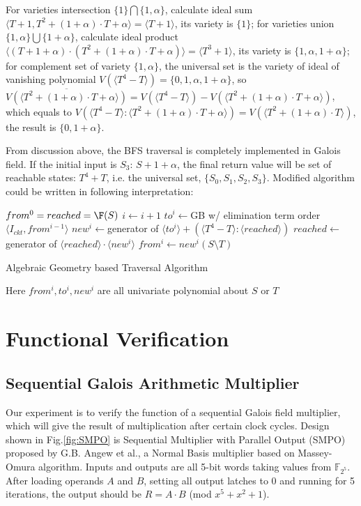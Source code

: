 For varieties intersection $\{1\}\bigcap\{1, \alpha\}$, calculate ideal sum $\langle T+1, T^2 + (1+\alpha)\cdot T+\alpha\rangle  = \langle T+1\rangle $,
its variety is $\{1\}$; for varieties union $\{1,\alpha\}\bigcup\{1+\alpha\}$, calculate
ideal product $\langle (T+1+\alpha)\cdot(T^2 + (1+\alpha)\cdot T+\alpha)\rangle  = \langle T^3 + 1\rangle $, its variety
is $\{1, \alpha, 1+\alpha\}$; for complement set of variety $\{1, \alpha\}$, the universal set is
the variety of ideal of vanishing polynomial $V(\langle T^4-T\rangle ) = \{0,1,\alpha,1+\alpha\}$,
so $\overline{V(\langle T^2 + (1+\alpha)\cdot T+\alpha\rangle )} = V(\langle T^4-T\rangle ) - V(\langle T^2 + (1+\alpha)\cdot T+\alpha\rangle )$,
which equals to $V(\langle T^4-T\rangle :\langle T^2 + (1+\alpha)\cdot T+\alpha\rangle ) = V(\langle T^2+(1+\alpha)\cdot T\rangle )$,
the result is $\{0,1+\alpha\}$.

From discussion above, the BFS traversal is completely implemented in Galois field.
If the initial input is $S_3$: $S + 1 + \alpha$, the final return value will be set of
reachable states: $T^4 + T$, i.e. the universal set, $\{S_0, S_1, S_2, S_3\}$. Modified algorithm could be
written in following interpretation:

\begin{algorithm}[hbt]
\SetAlgoNoLine

  $from^0 = reached = \F(S)$\;
  {
  	$i \gets i + 1$\;
	$to^i \gets$GB w/ elimination term order$\langle I_{ckt}, from^{i-1}\rangle$\;
	$new^i \gets $generator of $\langle to^i\rangle + (\langle T^4-T\rangle:\langle reached\rangle)$\;
  	$reached \gets $generator of $\langle reached\rangle \cdot \langle new^i\rangle$\;
	$from^i \gets new^i(S\setminus T)$\;
  }
\caption {Algebraic Geometry based Traversal Algorithm}\label{alg:modified}
\end{algorithm}

Here $from^i, to^i, new^i$ are all univariate polynomial about $S$ or $T$



\section{Functional Verification}
\subsection{Sequential Galois Arithmetic Multiplier}
Our experiment is to verify the function of a sequential Galois field multiplier, which will
give the result of multiplication after certain clock cycles.
Design shown in Fig.\ref{fig:SMPO} is Sequential Multiplier with Parallel Output (SMPO) proposed by 
G.B. Angew et al.\cite{agnew1991implementation},
a Normal Basis multiplier based on Massey-Omura algorithm. Inputs and outputs
are all 5-bit words taking values from ${\mathbb F}_{2^5}$. After loading operands
 $A$ and $B$, setting all output latches to 0 and running for 5 iterations, the 
output should be $R = A\cdot B$ (mod $x^5 + x^2 + 1$).

